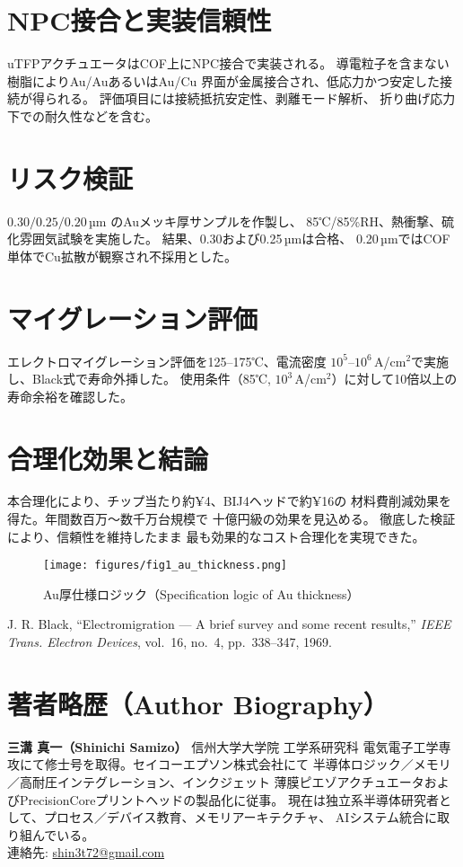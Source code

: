 \documentclass[a4paper,12pt]{jsarticle}
\begin{document}
\section{NPC接合と実装信頼性}
uTFPアクチュエータはCOF上にNPC接合で実装される。
導電粒子を含まない樹脂によりAu/AuあるいはAu/Cu
界面が金属接合され、低応力かつ安定した接続が得られる。
評価項目には接続抵抗安定性、剥離モード解析、
折り曲げ応力下での耐久性などを含む。

\section{リスク検証}
$0.30/0.25/0.20$\,µm のAuメッキ厚サンプルを作製し、
85℃/85\%RH、熱衝撃、硫化雰囲気試験を実施した。
結果、0.30および0.25\,µmは合格、
0.20\,µmではCOF単体でCu拡散が観察され不採用とした。

\section{マイグレーション評価}
エレクトロマイグレーション評価を125--175℃、電流密度
$10^5$--$10^6$\,A/cm$^2$で実施し、Black式で寿命外挿した。
使用条件（85℃, $10^3$\,A/cm$^2$）に対して10倍以上の寿命余裕を確認した。

\section{合理化効果と結論}
本合理化により、チップ当たり約¥4、BIJ4ヘッドで約¥16の
材料費削減効果を得た。年間数百万〜数千万台規模で
十億円級の効果を見込める。
徹底した検証により、信頼性を維持したまま
最も効果的なコスト合理化を実現できた。

\begin{figure}[h]
  \centering
  \texttt{[image: figures/fig1\_au\_thickness.png]}
  \caption{Au厚仕様ロジック（Specification logic of Au thickness）}
  \label{fig:au}
\end{figure}

\begin{thebibliography}{9}
J. R. Black, ``Electromigration --- A brief survey and some recent results,''
\emph{IEEE Trans. Electron Devices}, vol.~16, no.~4, pp.~338--347, 1969.
\end{thebibliography}

\section*{著者略歴（Author Biography）}
\textbf{三溝 真一（Shinichi Samizo）} 信州大学大学院 工学系研究科
電気電子工学専攻にて修士号を取得。セイコーエプソン株式会社にて
半導体ロジック／メモリ／高耐圧インテグレーション、インクジェット
薄膜ピエゾアクチュエータおよびPrecisionCoreプリントヘッドの製品化に従事。
現在は独立系半導体研究者として、プロセス／デバイス教育、メモリアーキテクチャ、
AIシステム統合に取り組んでいる。\\
連絡先: \href{mailto:shin3t72@gmail.com}{shin3t72@gmail.com}
\end{document}
